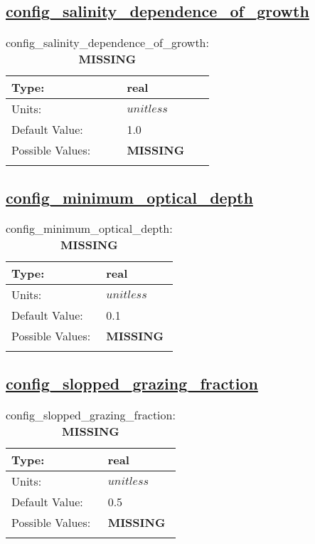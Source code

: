 \subsection[config\_salinity\_dependence\_of\_growth]{\hyperref[sec:nm_tab_biogeochemistry]{config\_salinity\_dependence\_of\_growth}}
\label{subsec:nm_sec_config_salinity_dependence_of_growth}
\begin{center}
\begin{longtable}{| p{2.0in} || p{4.0in} |}
    \hline
    Type: & real \\
    \hline
    Units: & $unitless$ \\
    \hline
    Default Value: & 1.0 \\
    \hline
    Possible Values: & {\bf \color{red} MISSING} \\
    \hline
    \caption{config\_salinity\_dependence\_of\_growth: {\bf \color{red} MISSING}}
\end{longtable}
\end{center}
\subsection[config\_minimum\_optical\_depth]{\hyperref[sec:nm_tab_biogeochemistry]{config\_minimum\_optical\_depth}}
\label{subsec:nm_sec_config_minimum_optical_depth}
\begin{center}
\begin{longtable}{| p{2.0in} || p{4.0in} |}
    \hline
    Type: & real \\
    \hline
    Units: & $unitless$ \\
    \hline
    Default Value: & 0.1 \\
    \hline
    Possible Values: & {\bf \color{red} MISSING} \\
    \hline
    \caption{config\_minimum\_optical\_depth: {\bf \color{red} MISSING}}
\end{longtable}
\end{center}
\subsection[config\_slopped\_grazing\_fraction]{\hyperref[sec:nm_tab_biogeochemistry]{config\_slopped\_grazing\_fraction}}
\label{subsec:nm_sec_config_slopped_grazing_fraction}
\begin{center}
\begin{longtable}{| p{2.0in} || p{4.0in} |}
    \hline
    Type: & real \\
    \hline
    Units: & $unitless$ \\
    \hline
    Default Value: & 0.5 \\
    \hline
    Possible Values: & {\bf \color{red} MISSING} \\
    \hline
    \caption{config\_slopped\_grazing\_fraction: {\bf \color{red} MISSING}}
\end{longtable}
\end{center}

